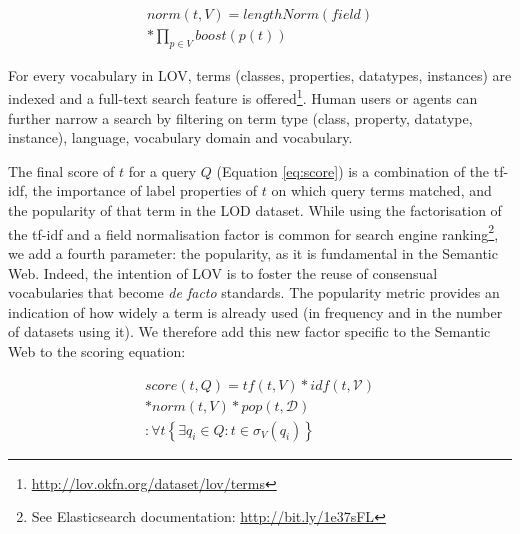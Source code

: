 \documentclass{iosart2c}
\begin{document}
\begin{equation}\label{eq:norm}
\begin{split}
norm(t,V) =  lengthNorm(field) \\
* \prod_{p \in V} boost(p(t))
\end{split}
\end{equation}

For every vocabulary in LOV, terms (classes, properties, datatypes, instances) are indexed and a full-text search feature is offered\footnote{\url{http://lov.okfn.org/dataset/lov/terms}}. Human users or agents can further narrow a search by filtering on term type (class, property, datatype, instance), language, vocabulary domain and vocabulary.

The final score of $t$ for a query $Q$ (Equation \ref{eq:score}) is a combination of the tf-idf, the importance of label properties of $t$ on which query terms matched, and the popularity of that term in the LOD dataset.  While using the factorisation of the tf-idf and a field normalisation factor is common for search engine ranking\footnote{See Elasticsearch documentation: \url{http://bit.ly/1e37sFL}}, we add a fourth parameter: the popularity, as it is fundamental in the Semantic Web. Indeed, the intention of LOV is to foster the reuse of consensual vocabularies that become \textit{de facto} standards. The popularity metric provides an indication of how widely a term is already used (in frequency and in the number of datasets using it). We therefore add this new factor specific to the Semantic Web to the scoring equation:
 

\begin{equation}\label{eq:score}
\begin{split}
score(t,Q) =tf(t,V) * idf(t,\mathcal{V}) \\
* norm(t,V) * pop(t,\mathcal{D})\\
: \forall t\left\{\exists q_i \in Q: t \in \sigma_V(q_i)\right\}
\end{split}
\end{equation}
\end{document}
